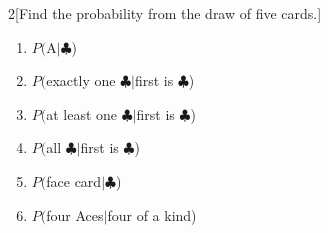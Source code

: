 \documentclass[14pt]{extarticle}
\begin{document}
\begin{multicols}{2}[Find the probability from the draw of five cards.]
	\begin{enumerate}
		\item $P($A$\mid\clubsuit$) \vspace{1.6cm}
		\item $P($exactly one $\clubsuit$$\mid$first is $\clubsuit$) \vspace{1.6cm}
		\item $P($at least one $\clubsuit$$\mid$first is $\clubsuit$) \vfill\null\columnbreak
		\item $P($all $\clubsuit$$\mid$first is $\clubsuit$) \vspace{1.6cm}
		\item $P($face card$\mid\clubsuit$) \vspace{1.6cm}
		\item $P($four Aces$\mid$four of a kind) \vfill\null
	\end{enumerate}
\end{multicols}
\vspace{1cm}
\end{document}
